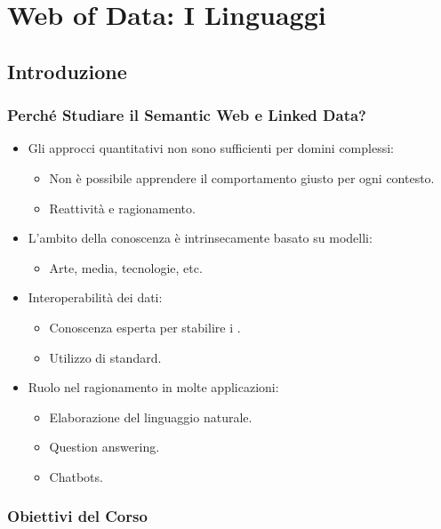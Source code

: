 \chapter{Web of Data: I Linguaggi}

\section{Introduzione}

\subsection{Perché Studiare il Semantic Web e Linked Data?}

\begin{itemize}
  \item Gli approcci quantitativi non sono sufficienti per domini complessi: 
    \begin{itemize}
      \item Non è possibile apprendere il comportamento giusto per ogni contesto. 
      \item Reattività e ragionamento.
    \end{itemize}
  \item L'ambito della conoscenza è intrinsecamente basato su modelli: 
    \begin{itemize}
      \item Arte, media, tecnologie, etc. 
    \end{itemize}
  \item Interoperabilità dei dati: 
    \begin{itemize}
      \item Conoscenza esperta per stabilire i . 
      \item Utilizzo di standard.
    \end{itemize}
  \item Ruolo nel ragionamento in molte applicazioni: 
    \begin{itemize}
      \item Elaborazione del linguaggio naturale. 
      \item Question answering. 
      \item Chatbots.
    \end{itemize}
\end{itemize}

\subsection{Obiettivi del Corso}

